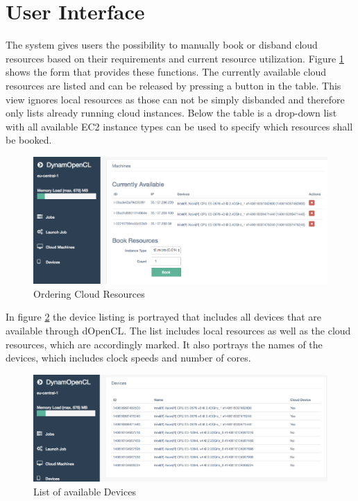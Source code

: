 \section{User Interface}

The system gives users the possibility to manually book or disband cloud resources based on their requirements and current resource utilization. Figure \ref{img:machine_order} shows the form that provides these functions. The currently available cloud resources are listed and can be released by pressing a button in the table. This view ignores local resources as those can not be simply disbanded and therefore only lists already running cloud instances. Below the table is a drop-down list with all available EC2 instance types can be used to specify which resources shall be booked.

\begin{figure}[!htb]
	\includegraphics[width=1\textwidth]{screenshots/machine_order.png}
	\centering
	\caption{Ordering Cloud Resources}
	\label{img:machine_order}
\end{figure}

In figure \ref{img:available_devices} the device listing is portrayed that includes all devices that are available through dOpenCL. The list includes local resources as well as the cloud resources, which are accordingly marked. It also portrays the names of the devices, which includes clock speeds and number of cores. 

\begin{figure}[!htb]
	\includegraphics[width=1\textwidth]{screenshots/available_devices.png}
	\centering
	\caption{List of available Devices}
	\label{img:available_devices}
\end{figure}

